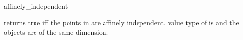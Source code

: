 \begin{ccRefFunction}{affinely_independent}
\ccHtmlNoLinks

{returns true iff the points in \ccc{A = tuple [first,last)} are 
affinely independent.
\ccPrecond value type of  is 
and the objects are of the same dimension.}

\end{ccRefFunction}

